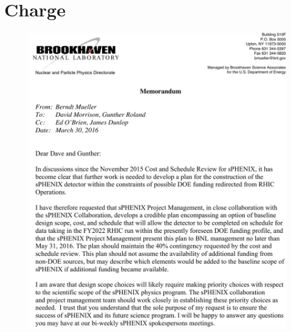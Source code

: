\chapter*{Charge}
\label{charge}

\begin{figure}[hbt!]
  \centering
  \includegraphics[width=0.8\linewidth]{charge_memo}
\end{figure}

